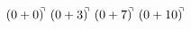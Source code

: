 \documentclass[preview]{standalone}
\begin{document}
\begin{align*}
(0+0)^{\hspace{-0.1cm}\urcorner} \ (0+3)^{\hspace{-0.1cm}\urcorner} \ (0+7)^{\hspace{-0.1cm}\urcorner} \ (0+10)^{\hspace{-0.1cm}\urcorner}
\end{align*}
\end{document}
